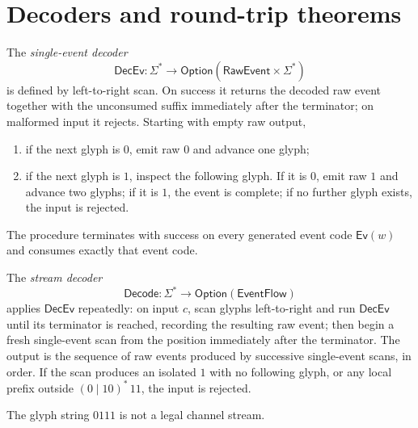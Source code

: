 \section{Decoders and round-trip theorems}
\label{sec:channel-encoding-decoders-and-roundtrip}

\begin{definition}
\label{def:channel-encoding-decoder-event}
The \emph{single-event decoder}
$$
  \mathsf{DecEv} \colon \Sigma^{*} \longrightarrow
  \mathsf{Option}(\mathsf{RawEvent} \times \Sigma^{*})
$$
is defined by left-to-right scan. On success it returns the decoded raw event together with the unconsumed suffix immediately after the terminator; on malformed input it rejects. Starting with empty raw output,
\begin{enumerate}
  \item if the next glyph is $0$, emit raw $0$ and advance one glyph;
  \item if the next glyph is $1$, inspect the following glyph. If it is $0$, emit raw $1$ and advance two glyphs; if it is $1$, the event is complete; if no further glyph exists, the input is rejected.
\end{enumerate}
The procedure terminates with success on every generated event code $\mathsf{Ev}(w)$ and consumes exactly that event code.
\end{definition}

\begin{definition}
\label{def:channel-encoding-decoder-stream}
The \emph{stream decoder}
$$
  \mathsf{Decode} \colon \Sigma^{*} \longrightarrow \mathsf{Option}(\mathsf{EventFlow})
$$
applies $\mathsf{DecEv}$ repeatedly: on input $c$, scan glyphs left-to-right and run $\mathsf{DecEv}$ until its terminator is reached, recording the resulting raw event; then begin a fresh single-event scan from the position immediately after the terminator. The output is the sequence of raw events produced by successive single-event scans, in order. If the scan produces an isolated $1$ with no following glyph, or any local prefix outside $(0 \mid 10)^{*}\,11$, the input is rejected.
\end{definition}

\begin{proposition}
\label{prop:channel-encoding-0111-illegal}
The glyph string $0111$ is not a legal channel stream.
\end{proposition}

